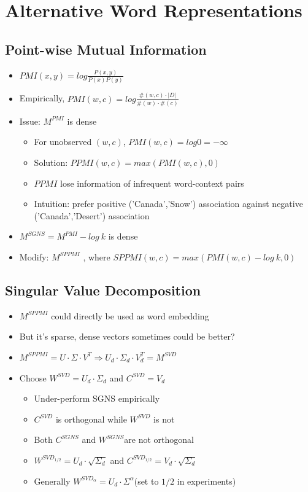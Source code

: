\documentclass[compress]{beamer}
\begin{document}
\section[Alternative]{Alternative Word Representations}
\subsection{Point-wise Mutual Information}
\begin{frame}{\subsecname}
	\begin{itemize}    
    	\item $PMI(x, y)=log\frac{P(x,y)}{P(x)P(y)}$
        \item Empirically,  $PMI(w,c)=log\frac{\#(w,c)\cdot |D|}{\#(w)\cdot \#(c)}$
        \item Issue: $M^{PMI}$ is dense 
        	\begin{itemize}
              \item For unobserved $(w,c)$, $PMI(w,c)=log0=-\infty$
              \item Solution:  $PPMI(w,c)=max(PMI(w,c), 0)$
              \item $PPMI$ lose information of infrequent word-context pairs
              \item Intuition: prefer positive ('Canada','Snow') association against negative  ('Canada','Desert') association
            \end{itemize}
       \item $M^{SGNS}=M^{PMI}-log~k$  is dense
       \item Modify: $M^{SPPMI}$ , where $SPPMI(w,c)=max(PMI(w,c)-log~k,0)$
    \end{itemize}
\end{frame}
\subsection{Singular Value Decomposition}
\begin{frame}{\subsecname}
    \begin{itemize}
        \item $M^{SPPMI}$ could directly be used as word embedding
        \item  But it's sparse, dense vectors sometimes could be better?
        \item $M^{SPPMI}=U\cdot \Sigma \cdot V^T \Rightarrow U_d\cdot \Sigma_d \cdot V^T_d = M^{SVD}$ 
        \item Choose $W^{SVD}=U_d\cdot \Sigma_d$ and $C^{SVD}=  V_d$
        \begin{itemize}
        \item Under-perform SGNS empirically
        \item $C^{SVD}$ is orthogonal while $W^{SVD}$ is not
        \item Both $C^{SGNS}$ and $W^{SGNS}$are not orthogonal
        \item $W^{SVD_{1/2}}=U_d\cdot \sqrt{\Sigma_d}$ and $C^{SVD_{1/2}}=  V_d\cdot\sqrt{\Sigma_d}$
        \item Generally $W^{SVD_{\alpha}}=U_d\cdot \Sigma^{\alpha}$(set to $1/2$ in experiments)
        \end{itemize}
    \end{itemize}
\end{frame}
\end{document}
